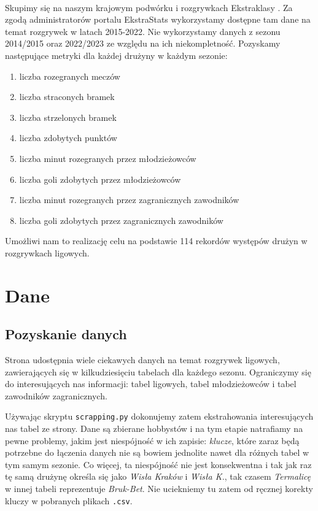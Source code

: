 \documentclass{article}
\newcommand{\pyobject}[1]{\texttt{#1}}
\begin{document}
\paragraph{}
Skupimy się na naszym krajowym podwórku i rozgrywkach Ekstraklasy \cite{ekstraklasa}. Za zgodą administratorów portalu EkstraStats \cite{ekstrastats} wykorzystamy dostępne tam dane na temat rozgrywek w latach 2015-2022. Nie wykorzystamy danych z sezonu 2014/2015 oraz 2022/2023 ze względu na ich niekompletność. Pozyskamy następujące metryki dla każdej drużyny w każdym sezonie:
\begin{enumerate}
    \item liczba rozegranych meczów
    \item liczba straconych bramek
    \item liczba strzelonych bramek
    \item liczba zdobytych punktów
    \item liczba minut rozegranych przez młodzieżowców
    \item liczba goli zdobytych przez młodzieżowców
    \item liczba minut rozegranych przez zagranicznych zawodników
    \item liczba goli zdobytych przez zagranicznych zawodników
\end{enumerate}
Umożliwi nam to realizację celu na podstawie 114 rekordów występów drużyn w rozgrywkach ligowych.

\section{Dane}

\subsection{Pozyskanie danych}

Strona \cite{ekstrastats} udostępnia wiele ciekawych danych na temat rozgrywek ligowych, zawierających się w kilkudziesięciu tabelach dla każdego sezonu. Ograniczymy się do interesujących nas informacji: tabel ligowych, tabel młodzieżowców i tabel zawodników zagranicznych. 

Używając skryptu \pyobject{scrapping.py} dokonujemy zatem ekstrahowania interesujących nas tabel ze strony. Dane są zbierane hobbystów i na tym etapie natrafiamy na pewne problemy, jakim jest niespójność w ich zapisie: \textit{klucze}, które zaraz będą potrzebne do łączenia danych nie są bowiem jednolite nawet dla różnych tabel w tym samym sezonie. Co więcej, ta niespójność nie jest konsekwentna i tak jak raz tę samą drużynę określa się jako \textit{Wisła Kraków} i \textit{Wisła K.}, tak czasem \textit{Termalicę} w innej tabeli reprezentuje \textit{Bruk-Bet}. Nie uciekniemy tu zatem od ręcznej korekty kluczy w pobranych plikach \pyobject{.csv}. 
\end{document}
